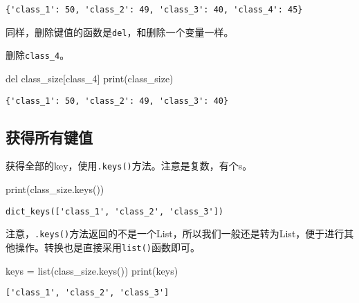 \documentclass[
  letterpaper,
  DIV=11,
  numbers=noendperiod]{scrreprt}
\newenvironment{Shaded}{\begin{snugshade}}{\end{snugshade}}
\newcommand{\BuiltInTok}[1]{\textcolor[rgb]{0.00,0.23,0.31}{#1}}
\newcommand{\KeywordTok}[1]{\textcolor[rgb]{0.00,0.23,0.31}{#1}}
\newcommand{\NormalTok}[1]{\textcolor[rgb]{0.00,0.23,0.31}{#1}}
\newcommand{\OperatorTok}[1]{\textcolor[rgb]{0.37,0.37,0.37}{#1}}
\newcommand{\StringTok}[1]{\textcolor[rgb]{0.13,0.47,0.30}{#1}}
\begin{document}
\begin{verbatim}
{'class_1': 50, 'class_2': 49, 'class_3': 40, 'class_4': 45}
\end{verbatim}

同样，删除键值的函数是\texttt{del}，和删除一个变量一样。

删除\texttt{\textquotesingle{}class\_4\textquotesingle{}}。

\begin{Shaded}
\begin{Highlighting}[]
\KeywordTok{del}\NormalTok{ class\_size[}\StringTok{\textquotesingle{}class\_4\textquotesingle{}}\NormalTok{] }
\BuiltInTok{print}\NormalTok{(class\_size)}
\end{Highlighting}
\end{Shaded}

\begin{verbatim}
{'class_1': 50, 'class_2': 49, 'class_3': 40}
\end{verbatim}

\hypertarget{ux83b7ux5f97ux6240ux6709ux952eux503c}{%
\subsection{获得所有键值}\label{ux83b7ux5f97ux6240ux6709ux952eux503c}}

获得全部的key，使用\texttt{.keys()}方法。注意是复数，有个s。

\begin{Shaded}
\begin{Highlighting}[]
\BuiltInTok{print}\NormalTok{(class\_size.keys())}
\end{Highlighting}
\end{Shaded}

\begin{verbatim}
dict_keys(['class_1', 'class_2', 'class_3'])
\end{verbatim}

注意，\texttt{.keys()}方法返回的不是一个List，所以我们一般还是转为List，便于进行其他操作。转换也是直接采用\texttt{list()}函数即可。

\begin{Shaded}
\begin{Highlighting}[]
\NormalTok{keys }\OperatorTok{=} \BuiltInTok{list}\NormalTok{(class\_size.keys())}
\BuiltInTok{print}\NormalTok{(keys)}
\end{Highlighting}
\end{Shaded}

\begin{verbatim}
['class_1', 'class_2', 'class_3']
\end{verbatim}
\end{document}
